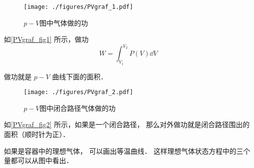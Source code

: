 
\begin{issues}
\issueDraft
\end{issues}


\begin{figure}[ht]
\centering
\texttt{[image: ./figures/PVgraf\_1.pdf]}
\caption{$p-V$图中气体做的功} \label{PVgraf_fig1}
\end{figure}

如\autoref{PVgraf_fig1} 所示，做功
\begin{equation}\label{PVgraf_eq1}
W = \int_{V_1}^{V_2}P(V) \dd{V}
\end{equation}

做功就是 $p-V$ 曲线下面的面积． 

\begin{figure}[ht]  
\centering
\texttt{[image: ./figures/PVgraf\_2.pdf]}
\caption{$p-V$图中闭合路径气体做的功} \label{PVgraf_fig2}
\end{figure}

如\autoref{PVgraf_fig2} 所示，如果是一个闭合路径， 那么对外做功就是闭合路径围出的面积（顺时针为正）．

如果是容器中的理想气体， 可以画出等温曲线． 这样理想气体状态方程中的三个量都可以从图中看出．
  